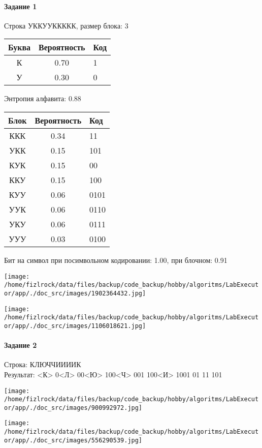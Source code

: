 \documentclass[a4paper, 12pt]{article}
\begin{document}
\paragraph{Задание 1}

Строка УККУУККККК, размер блока: 3
\begin{center}
 \begin{tabular}{ |c|c|l| } 
  \hline
     Буква & Вероятность & Код\\ \hline
К & 0.70 & 1\\\hline
У & 0.30 & 0
\\ \hline \end{tabular}
\end{center}
Энтропия алфавита: 0.88
\begin{center}
 \begin{tabular}{ |c|c|l| } 
  \hline
     Блок & Вероятность & Код\\ \hline
ККК & 0.34 & 11\\\hline
УКК & 0.15 & 101\\\hline
КУК & 0.15 & 00\\\hline
ККУ & 0.15 & 100\\\hline
КУУ & 0.06 & 0101\\\hline
УУК & 0.06 & 0110\\\hline
УКУ & 0.06 & 0111\\\hline
УУУ & 0.03 & 0100
\\ \hline \end{tabular}
\end{center}
Бит на символ при посимвольном кодировании: 1.00, при блочном: 0.91

\texttt{[image: /home/fizlrock/data/files/backup/code\_backup/hobby/algoritms/LabExecutor/app/./doc\_src/images/1902364432.jpg]}

\texttt{[image: /home/fizlrock/data/files/backup/code\_backup/hobby/algoritms/LabExecutor/app/./doc\_src/images/1106018621.jpg]}
\pagebreak
\paragraph{Задание 2}

Строка: 
КЛЮЧЧИИИИК\\
Результат: <К> 0<Л> 00<Ю> 100<Ч> 001 100<И> 1001 01 11 101

\texttt{[image: /home/fizlrock/data/files/backup/code\_backup/hobby/algoritms/LabExecutor/app/./doc\_src/images/900992972.jpg]}

\texttt{[image: /home/fizlrock/data/files/backup/code\_backup/hobby/algoritms/LabExecutor/app/./doc\_src/images/556290539.jpg]}
\end{document}
